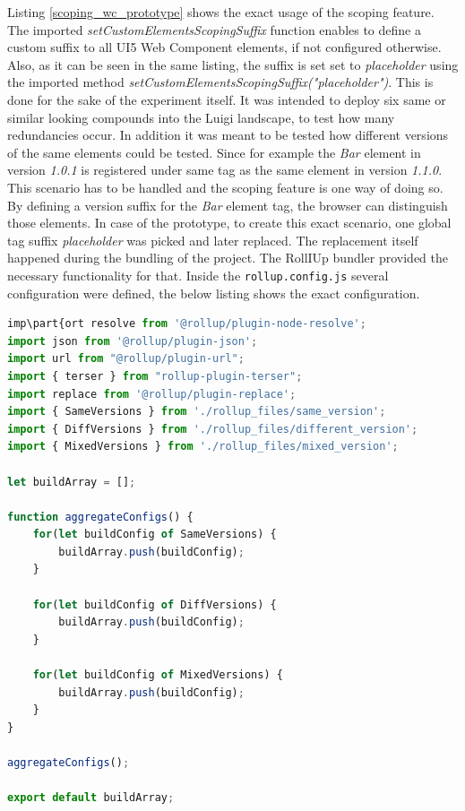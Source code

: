 Listing \ref{scoping_wc_prototype} shows the exact usage of the scoping feature. 
The imported \textit{setCustomElementsScopingSuffix} function enables to define a custom suffix to all UI5 Web Component elements, if not configured otherwise. Also, as it can be seen in the same listing, the suffix is set set to \textit{placeholder} using the imported method 
\textit{setCustomElementsScopingSuffix("placeholder")}.
This is done for the sake of the experiment itself. It was intended to deploy six same or similar looking compounds into the Luigi landscape, to test how many redundancies occur. In addition it was meant to be tested how different versions of the same elements could be tested. Since for example the \textit{Bar} element in version \textit{1.0.1} is registered under same tag as the same element in version \textit{1.1.0}. This scenario has to be handled and the scoping feature is one way of doing so.
By defining a version suffix for the \textit{Bar} element tag, the browser can distinguish those elements.
In case of the prototype, to create this exact scenario, one global tag suffix \textit{placeholder} was picked and later replaced. The replacement itself happened during the bundling of the project. The RollIUp bundler provided the necessary functionality for that.
Inside the \texttt{rollup.config.js} several configuration were defined, the below listing shows the exact configuration.

\begin{lstlisting}[language=JavaScript, caption=Content of the \texttt{rollup.config.js}, label=rollupconfigjs]
imp\part{ort resolve from '@rollup/plugin-node-resolve';
import json from '@rollup/plugin-json';
import url from "@rollup/plugin-url";
import { terser } from "rollup-plugin-terser";
import replace from '@rollup/plugin-replace';
import { SameVersions } from './rollup_files/same_version';
import { DiffVersions } from './rollup_files/different_version';
import { MixedVersions } from './rollup_files/mixed_version';

let buildArray = [];

function aggregateConfigs() {
	for(let buildConfig of SameVersions) {
		buildArray.push(buildConfig);
	}
	
	for(let buildConfig of DiffVersions) {
		buildArray.push(buildConfig);
	}
	
	for(let buildConfig of MixedVersions) {
		buildArray.push(buildConfig);
	}
}

aggregateConfigs();

export default buildArray;
\end{lstlisting}

